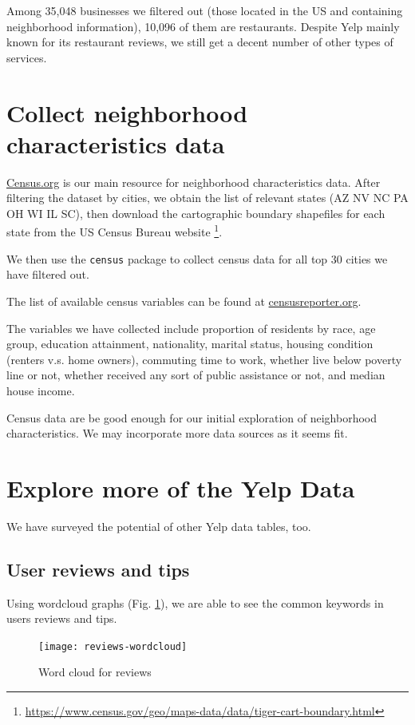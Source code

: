 \documentclass[draftclsnofoot]{IEEEtran}
\let\MYoriglatexcaption\caption
\renewcommand{\caption}[2][\relax]{\MYoriglatexcaption[#2]{#2}}
\begin{document}
Among 35,048 businesses we filtered out (those located in the US and containing neighborhood information), 10,096 of them are restaurants. Despite Yelp mainly known for its restaurant reviews, we still get a decent number of other types of services.

\section{Collect neighborhood characteristics data}

\url{Census.org} is our main resource for neighborhood characteristics data. After filtering the dataset by cities, we obtain the list of relevant states (AZ NV NC PA OH WI IL SC), then download the cartographic boundary shapefiles for each state from the US Census Bureau website \footnote{\url{https://www.census.gov/geo/maps-data/data/tiger-cart-boundary.html}}.

We then use the \texttt{census} package to collect census data for all  top 30 cities we have filtered out.

The list of available census variables can be found at \url{censusreporter.org}.

The variables we have collected include proportion of residents by race, age group, education attainment, nationality, marital status, housing condition (renters v.s. home owners), commuting time to work, whether live below poverty line or not, whether received any sort of public assistance or not, and median house income.

Census data are be good enough for our initial exploration of neighborhood characteristics. We may incorporate more data sources as it seems fit.

\section{Explore more of the Yelp Data}

We have surveyed the potential of other Yelp data tables, too.

\subsection{User reviews and tips}

Using wordcloud graphs (Fig. \ref{reviews-wordcloud}), we are able to see the common keywords in users reviews and tips.

\begin{figure}[h]
\hspace{-.5em}
\texttt{[image: reviews-wordcloud]}
\caption{Word cloud for reviews}
\label{reviews-wordcloud}
\end{figure}
\end{document}
